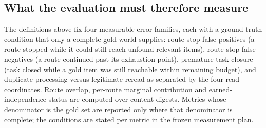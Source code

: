 \subsection{What the evaluation must therefore measure}

The definitions above fix four measurable error families, each with a
ground-truth condition that only a complete-gold world supplies: route-stop
false positives (a route stopped while it could still reach unfound relevant
items), route-stop false negatives (a route continued past its exhaustion
point), premature task closure (task closed while a gold item was still
reachable within remaining budget), and duplicate processing versus legitimate
reread as separated by the four read coordinates. Route overlap, per-route
marginal contribution and earned-independence status are computed over content
digests. Metrics whose denominator is the gold set are reported only where that
denominator is complete; the conditions are stated per metric in the frozen
measurement plan.
